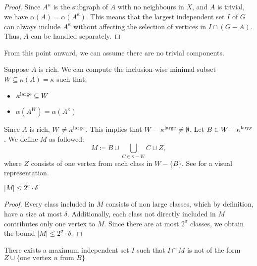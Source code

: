 \begin{proof}
    Since $A^\kappa$ is the subgraph of $A$ with no neighbours in $X$, and $A$ is trivial, we have $\alpha(A) = \alpha(A^\kappa)$. This means that the largest independent set $I$ of $G$ can always include $A^\kappa$ without affecting the selection of vertices in $I \cap (G - A)$. Thus, $A$ can be handled separately.
\end{proof}

From this point onward, we can assume there are no trivial components.

\medskip

Suppose $A$ is rich. We can compute the inclusion-wise minimal subset $W \subseteq \kappa(A) = \kappa$ such that:
\begin{itemize}
    \item $\kappa^\text{large} \subseteq W$
    \item $\alpha(A^W) = \alpha(A^\kappa)$
\end{itemize}

Since $A$ is rich, $W \neq \kappa^\text{large}$. This implies that $W - \kappa^\text{large} \neq \emptyset$. Let $B \in W - \kappa^\text{large}$. We define $M$ as followed: $$M \coloneqq B \cup \bigcup_{C \in \kappa - W} C \cup Z,$$ where $Z$ consists of one vertex from each class in $W - \{B\}$. See  for a visual representation.



\begin{observation}
    $|M| \leq 2^\sigma \cdot \delta$
\end{observation}

\begin{proof}
    Every class included in $M$ consists of non large classes, which by definition, have a size at most $\delta$. Additionally, each class not directly included in $M$ contributes only one vertex to $M$. Since there are at most $2^\sigma$ classes, we obtain the bound $|M| \leq 2^\sigma \cdot \delta$.
\end{proof}

\begin{claim}
    There exists a maximum independent set $I$ such that $I \cap M$ is not of the form $Z \cup \{\text{one vertex $u$ from $B$}\}$
\end{claim}

